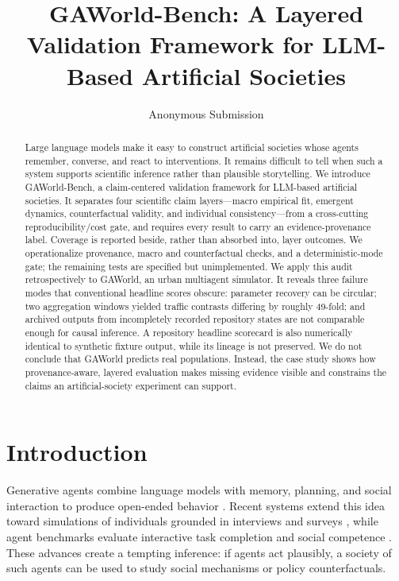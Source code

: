 \documentclass[letterpaper]{article}
\title{GAWorld-Bench: A Layered Validation Framework for LLM-Based Artificial Societies}
\author{Anonymous Submission}
\begin{document}
\maketitle

\begin{abstract}
Large language models make it easy to construct artificial societies whose agents remember, converse,
and react to interventions. It remains difficult to tell when such a system supports scientific inference
rather than plausible storytelling. We introduce GAWorld-Bench, a claim-centered validation framework
for LLM-based artificial societies. It separates four scientific claim layers---macro empirical fit,
emergent dynamics, counterfactual validity, and individual consistency---from a cross-cutting
reproducibility/cost gate, and requires every result to carry an evidence-provenance label. Coverage is
reported beside, rather than absorbed into, layer outcomes. We operationalize provenance, macro and
counterfactual checks, and a deterministic-mode gate; the remaining tests are specified but unimplemented.
We apply this audit retrospectively to GAWorld, an urban multiagent simulator. It reveals three failure
modes that conventional headline scores obscure: parameter recovery can be circular; two aggregation
windows yielded traffic contrasts differing by roughly 49-fold; and archived outputs from incompletely
recorded repository states are not comparable enough for causal inference. A repository headline
scorecard is also numerically identical to synthetic fixture output, while its lineage is not preserved.
We do not conclude that GAWorld predicts real populations. Instead, the case study shows how
provenance-aware, layered evaluation makes missing evidence visible and constrains the claims an
artificial-society experiment can support.
\end{abstract}

\section{Introduction}

Generative agents combine language models with memory, planning, and social interaction to produce
open-ended behavior \cite{park2023generative}. Recent systems extend this idea toward simulations of
individuals grounded in interviews and surveys \cite{park2024grounded}, while agent benchmarks evaluate
interactive task completion \cite{liu2024agentbench,ma2024agentboard} and social competence
\cite{zhou2024sotopia}. These advances create a tempting inference: if agents act plausibly, a society of
such agents can be used to study social mechanisms or policy counterfactuals.
\end{document}
